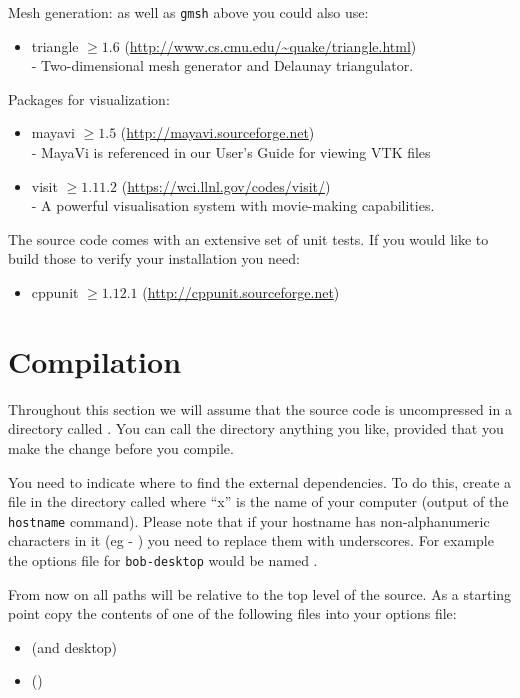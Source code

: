\noindent Mesh generation: as well as \texttt{gmsh} above you could also use:
\begin{itemize}
 \item triangle $\geq 1.6$ (\url{http://www.cs.cmu.edu/~quake/triangle.html}) \\-
        Two-dimensional mesh generator and Delaunay triangulator.
\end{itemize}

Packages for visualization:
\begin{itemize}
 \item mayavi $\geq 1.5$ (\url{http://mayavi.sourceforge.net}) \\-
        MayaVi is referenced in our User's Guide for viewing VTK files
 \item visit $\geq 1.11.2$ (\url{https://wci.llnl.gov/codes/visit/}) \\-
        A powerful visualisation system with movie-making capabilities.
\end{itemize}



The source code comes with an extensive set of unit tests. If you would like to
build those to verify your installation you need:
\begin{itemize}
 \item cppunit $\geq 1.12.1$ (\url{http://cppunit.sourceforge.net})
\end{itemize}

\section{Compilation}\label{sec:compilesrc}
Throughout this section we will assume that the source code is uncompressed in a directory called .
You can call the directory anything you like, provided that you make the change before you compile.

You need to indicate where to find the external dependencies.
To do this, create a file in the  directory called  where ``x'' is the name of your computer (output of the \texttt{hostname} command).
Please note that if your hostname has non-alphanumeric characters in it (eg - ) you need to replace them with underscores.
For example the options file for \texttt{bob-desktop} would be named .

From now on all paths will be relative to the top level of the source.
As a starting point copy the contents of one of the following files into your options file:
\begin{itemize}
\item {} (\linux and \macosx desktop)
\item {} (\winxp)
\end{itemize}

